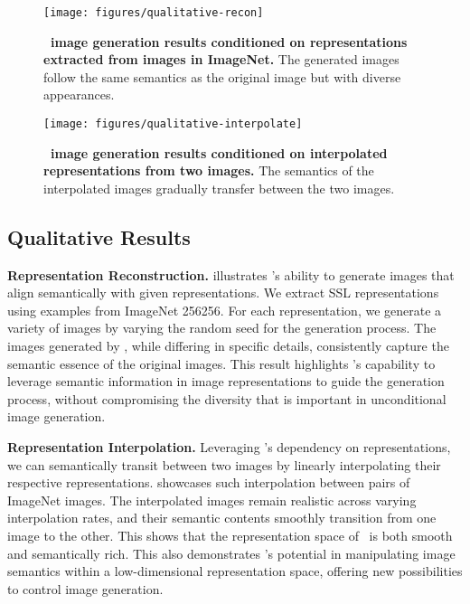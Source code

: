 \begin{figure*}[t]
\begin{center}
\texttt{[image: figures/qualitative-recon]}
\end{center}
\vspace{-10pt}
\caption{\textbf{\name~image generation results conditioned on representations extracted from images in ImageNet.} The generated images follow the same semantics as the original image but with diverse appearances.}
\label{fig:qualitative-recon}

\begin{center}
\vspace{-5pt}
\texttt{[image: figures/qualitative-interpolate]}
\end{center}
\vspace{-10pt}
\caption{\textbf{\name~image generation results conditioned on interpolated representations from two images.} The semantics of the interpolated images gradually transfer between the two images.}
\vspace{-2pt}
\label{fig:qualitative-interpolate}
\end{figure*}

\subsection{Qualitative Results}

\noindent\textbf{Representation Reconstruction.}  illustrates \name's ability to generate images that align semantically with given representations. We extract SSL representations using examples from ImageNet 256256. For each representation, we generate a variety of images by varying the random seed for the generation process. The images generated by \name, while differing in specific details, consistently capture the semantic essence of the original images. This result highlights \name's capability to leverage semantic information in image representations to guide the generation process, without compromising the diversity that is important in unconditional image generation.

\noindent\textbf{Representation Interpolation.} Leveraging \name's dependency on representations, we can semantically transit between two images by linearly interpolating their respective representations.  showcases such interpolation between pairs of ImageNet images. The interpolated images remain realistic across varying interpolation rates, and their semantic contents smoothly transition from one image to the other. This shows that the representation space of \name~is both smooth and semantically rich. This also demonstrates \name's potential in manipulating image semantics within a low-dimensional representation space, offering new possibilities to control image generation.